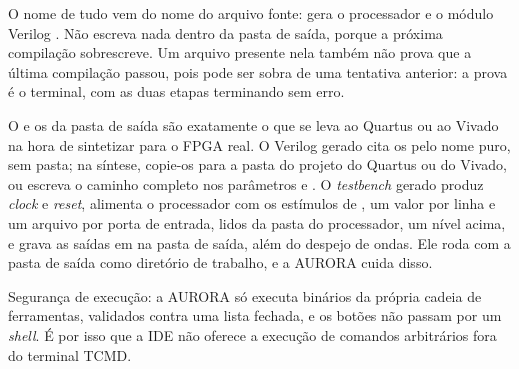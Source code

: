 O nome de tudo vem do nome do arquivo fonte:  gera o processador  e o módulo Verilog . Não escreva nada dentro da pasta de saída, porque a próxima compilação sobrescreve. Um arquivo presente nela também não prova que a última compilação passou, pois pode ser sobra de uma tentativa anterior: a prova é o terminal, com as duas etapas terminando sem erro.

O  e os  da pasta de saída são exatamente o que se leva ao Quartus ou ao Vivado na hora de sintetizar para o FPGA real. O Verilog gerado cita os  pelo nome puro, sem pasta; na síntese, copie-os para a pasta do projeto do Quartus ou do Vivado, ou escreva o caminho completo nos parâmetros  e . O \textit{testbench} gerado produz \textit{clock} e \textit{reset}, alimenta o processador com os estímulos de , um valor por linha e um arquivo por porta de entrada, lidos da pasta do processador, um nível acima, e grava as saídas em  na pasta de saída, além do despejo de ondas. Ele roda com a pasta de saída como diretório de trabalho, e a AURORA cuida disso.

\begin{nota}
Segurança de execução: a AURORA só executa binários da própria cadeia de ferramentas, validados contra uma lista fechada, e os botões não passam por um \textit{shell}. É por isso que a IDE não oferece a execução de comandos arbitrários fora do terminal TCMD.
\end{nota}

